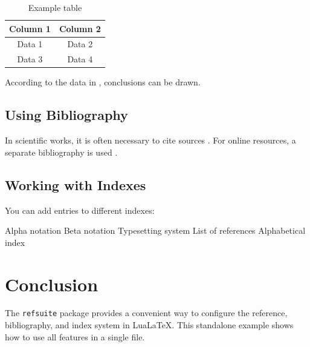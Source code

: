\documentclass{article}
\begin{document}
\begin{table}[htbp]
    \centering
    \begin{tabular}{|c|c|}
        \hline
        Column 1 & Column 2 \\
        \hline
        Data 1 & Data 2 \\
        Data 3 & Data 4 \\
        \hline
    \end{tabular}
    \caption{Example table}
    \label{tab:sample}
\end{table}

According to the data in , conclusions can be drawn.

\subsection{Using Bibliography}

In scientific works, it is often necessary to cite sources \cite{knuth1984texbook}. 
For online resources, a separate bibliography is used \cite{torvalds2003git}.

\subsection{Working with Indexes}

You can add entries to different indexes:

\index[notation]{$\alpha$} Alpha notation
\index[notation]{$\beta$} Beta notation
 Typesetting system
 List of references
 Alphabetical index

\section{Conclusion}
\label{sec:conclusion}

The \texttt{refsuite} package provides a convenient way to configure the reference, bibliography, and index system in LuaLaTeX. This standalone example shows how to use all features in a single file.


\printbibliographymain
\printbibliographygit


\printindexnotation
\printindex
\end{document}
